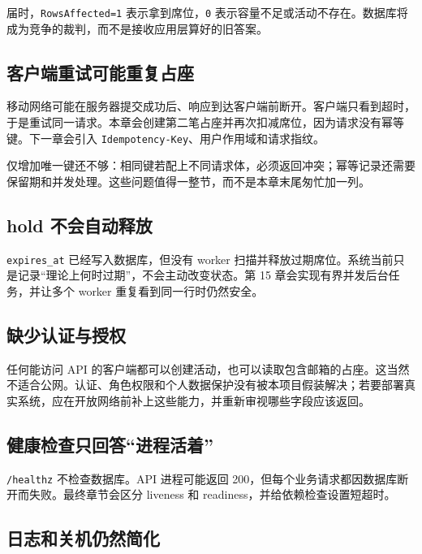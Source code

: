
届时，\texttt{RowsAffected=1} 表示拿到席位，\texttt{0} 表示容量不足或活动不存在。数据库将成为竞争的裁判，而不是接收应用层算好的旧答案。

\subsection{客户端重试可能重复占座}

移动网络可能在服务器提交成功后、响应到达客户端前断开。客户端只看到超时，于是重试同一请求。本章会创建第二笔占座并再次扣减席位，因为请求没有幂等键。下一章会引入 \texttt{Idempotency-Key}、用户作用域和请求指纹。

仅增加唯一键还不够：相同键若配上不同请求体，必须返回冲突；幂等记录还需要保留期和并发处理。这些问题值得一整节，而不是本章末尾匆忙加一列。

\subsection{hold 不会自动释放}

\texttt{expires\_at} 已经写入数据库，但没有 worker 扫描并释放过期席位。系统当前只是记录“理论上何时过期”，不会主动改变状态。第 15 章会实现有界并发后台任务，并让多个 worker 重复看到同一行时仍然安全。

\subsection{缺少认证与授权}

任何能访问 API 的客户端都可以创建活动，也可以读取包含邮箱的占座。这当然不适合公网。认证、角色权限和个人数据保护没有被本项目假装解决；若要部署真实系统，应在开放网络前补上这些能力，并重新审视哪些字段应该返回。

\subsection{健康检查只回答“进程活着”}

\texttt{/healthz} 不检查数据库。API 进程可能返回 200，但每个业务请求都因数据库断开而失败。最终章节会区分 liveness 和 readiness，并给依赖检查设置短超时。

\subsection{日志和关机仍然简化}

